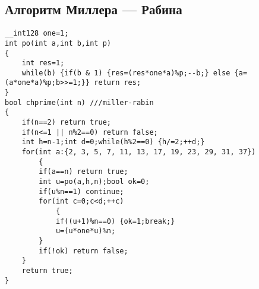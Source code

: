 \subsection{Алгоритм Миллера --- Рабина}
\begin{lstlisting}
__int128 one=1;
int po(int a,int b,int p)
{
    int res=1;
    while(b) {if(b & 1) {res=(res*one*a)%p;--b;} else {a=(a*one*a)%p;b>>=1;}} return res;
}
bool chprime(int n) ///miller-rabin
{
    if(n==2) return true;
    if(n<=1 || n%2==0) return false;
    int h=n-1;int d=0;while(h%2==0) {h/=2;++d;}
    for(int a:{2, 3, 5, 7, 11, 13, 17, 19, 23, 29, 31, 37})
        {
        if(a==n) return true;
        int u=po(a,h,n);bool ok=0;
        if(u%n==1) continue;
        for(int c=0;c<d;++c)
            {
            if((u+1)%n==0) {ok=1;break;}
            u=(u*one*u)%n;
        }
        if(!ok) return false;
    }
    return true;
}
\end{lstlisting}